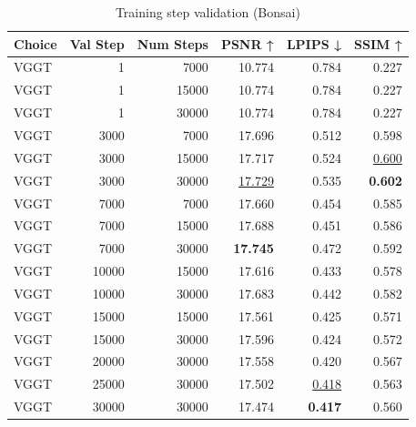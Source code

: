 \begin{table}[H]
\caption{Training step validation (Bonsai)}
\label{tab:99_training_step_validation_bonsai}
\begin{tabular}{lrrrrr}
\toprule
Choice & Val Step & Num Steps & PSNR ↑ & LPIPS ↓ & SSIM ↑ \\
\midrule
VGGT & 1 & 7000 & 10.774 & 0.784 & 0.227 \\
VGGT & 1 & 15000 & 10.774 & 0.784 & 0.227 \\
VGGT & 1 & 30000 & 10.774 & 0.784 & 0.227 \\
VGGT & 3000 & 7000 & 17.696 & 0.512 & 0.598 \\
VGGT & 3000 & 15000 & 17.717 & 0.524 & \underline{0.600} \\
VGGT & 3000 & 30000 & \underline{17.729} & 0.535 & \textbf{0.602} \\
VGGT & 7000 & 7000 & 17.660 & 0.454 & 0.585 \\
VGGT & 7000 & 15000 & 17.688 & 0.451 & 0.586 \\
VGGT & 7000 & 30000 & \textbf{17.745} & 0.472 & 0.592 \\
VGGT & 10000 & 15000 & 17.616 & 0.433 & 0.578 \\
VGGT & 10000 & 30000 & 17.683 & 0.442 & 0.582 \\
VGGT & 15000 & 15000 & 17.561 & 0.425 & 0.571 \\
VGGT & 15000 & 30000 & 17.596 & 0.424 & 0.572 \\
VGGT & 20000 & 30000 & 17.558 & 0.420 & 0.567 \\
VGGT & 25000 & 30000 & 17.502 & \underline{0.418} & 0.563 \\
VGGT & 30000 & 30000 & 17.474 & \textbf{0.417} & 0.560 \\
\bottomrule
\end{tabular}
\end{table}
